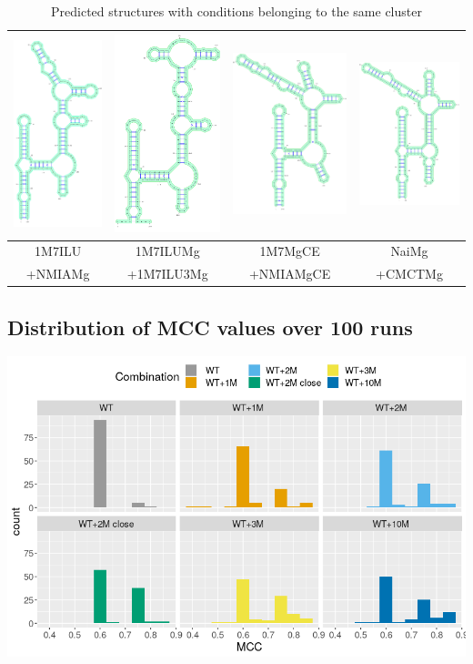 \documentclass[11pt]{article} %
\begin{document}
\begin{table}
\newcommand{\MyScale}{.2}
\begin{tabular}{@{}cccc@{}}
 \includegraphics[scale=\MyScale]{graphs/Supp_structures/1M7ILU_NMIAMg}& \includegraphics[scale=\MyScale]{graphs/Supp_structures/1M7ILUMg_1M7ILU3Mg}& \includegraphics[scale=\MyScale]{graphs/Supp_structures/1M7MgCE_NMIAMgCE}& \includegraphics[scale=\MyScale]{graphs/Supp_structures/NaiMg_CMCTMg}\\
 \midrule
1M7ILU&1M7ILUMg&1M7MgCE&NaiMg\\
+NMIAMg&+1M7ILU3Mg&+NMIAMgCE&+CMCTMg\\
\end{tabular}
\caption{Predicted structures with conditions belonging to the same cluster}
\end{table}

\subsection{Distribution of MCC values over 100 runs}
\includegraphics[width=\linewidth]{graphs/histog1}
\end{document}
